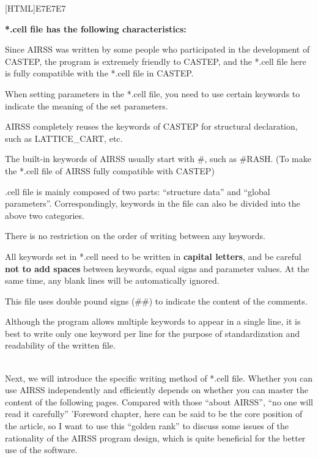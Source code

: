 \documentclass[a4paper, 10pt]{article}
\begin{document}
\noindent{}[HTML]{E7E7E7}{\parbox{\textwidth}{%
\noindent \textbf{*.cell file has the following characteristics:}
\begin{maineu}
\item Since AIRSS was written by some people who participated in the development of CASTEP, the program is extremely friendly to CASTEP, and the *.cell file here is fully compatible with the *.cell file in CASTEP.
\item When setting parameters in the *.cell file, you need to use certain keywords to indicate the meaning of the set parameters.
\item AIRSS completely reuses the keywords of CASTEP for structural declaration, such as LATTICE\_CART, etc.
\item The built-in keywords of AIRSS usually start with \#, such as \#RASH. (To make the *.cell file of AIRSS fully compatible with CASTEP)
\item *.cell file is mainly composed of two parts: ``structure data'' and ``global parameters''. Correspondingly, keywords in the file can also be divided into the above two categories.
\item There is no restriction on the order of writing between any keywords.
\item All keywords set in *.cell need to be written in \textbf{capital letters}, and be careful \textbf{not to add spaces} between keywords, equal signs and parameter values. At the same time, any blank lines will be automatically ignored.
\item This file uses double pound signs (\#\#) to indicate the content of the comments.
\item Although the program allows multiple keywords to appear in a single line, it is best to write only one keyword per line for the purpose of standardization and readability of the written file.
\end{maineu}}}\\

Next, we will introduce the specific writing method of *.cell file. Whether you can use AIRSS independently and efficiently depends on whether you can master the content of the following pages. Compared with those ``about AIRSS'', ​​``no one will read it carefully'' 'Foreword chapter, here can be said to be the core position of the article, so I want to use this ``golden rank'' to discuss some issues of the rationality of the AIRSS program design, which is quite beneficial for the better use of the software.
\end{document}
